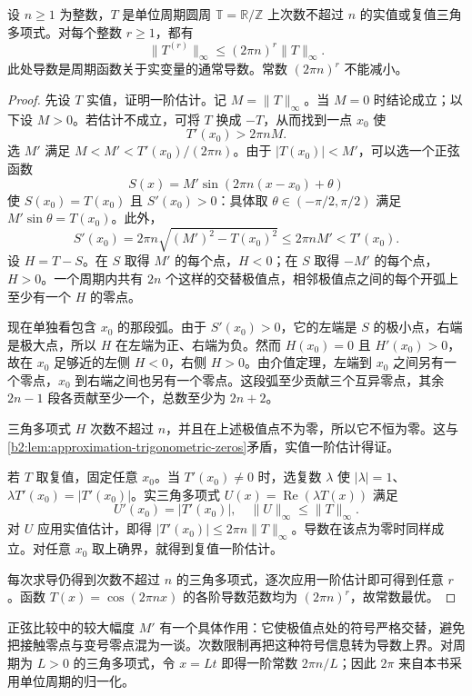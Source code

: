 \begin{theorem}
\label{b2:thm:approximation-bernstein-trigonometric}
设 \(n\geq1\) 为整数，\(T\) 是单位周期圆周 \(\mathbb T=\mathbb R/\mathbb Z\) 上次数不超过 \(n\) 的实值或复值三角多项式。对每个整数 \(r\geq1\)，都有
\[
 \lVert T^{(r)}\rVert_\infty
 \leq(2\pi n)^r\lVert T\rVert_\infty.
\]
此处导数是周期函数关于实变量的通常导数。常数 \((2\pi n)^r\) 不能减小。
\end{theorem}
\begin{proof}
先设 \(T\) 实值，证明一阶估计。记 \(M=\lVert T\rVert_\infty\)。当 \(M=0\) 时结论成立；以下设 \(M>0\)。若估计不成立，可将 \(T\) 换成 \(-T\)，从而找到一点 \(x_0\) 使
\[
 T'(x_0)>2\pi nM.
\]
选 \(M'\) 满足 \(M<M'<T'(x_0)/(2\pi n)\)。由于 \(|T(x_0)|<M'\)，可以选一个正弦函数
\[
 S(x)=M'\sin(2\pi n(x-x_0)+\theta)
\]
使 \(S(x_0)=T(x_0)\) 且 \(S'(x_0)>0\)：具体取 \(\theta\in(-\pi/2,\pi/2)\) 满足 \(M'\sin\theta=T(x_0)\)。此外，
\[
 S'(x_0)=2\pi n\sqrt{(M')^2-T(x_0)^2}
 \leq2\pi nM'<T'(x_0).
\]
设 \(H=T-S\)。在 \(S\) 取得 \(M'\) 的每个点，\(H<0\)；在 \(S\) 取得 \(-M'\) 的每个点，\(H>0\)。一个周期内共有 \(2n\) 个这样的交替极值点，相邻极值点之间的每个开弧上至少有一个 \(H\) 的零点。

现在单独看包含 \(x_0\) 的那段弧。由于 \(S'(x_0)>0\)，它的左端是 \(S\) 的极小点，右端是极大点，所以 \(H\) 在左端为正、右端为负。然而 \(H(x_0)=0\) 且 \(H'(x_0)>0\)，故在 \(x_0\) 足够近的左侧 \(H<0\)，右侧 \(H>0\)。由介值定理，左端到 \(x_0\) 之间另有一个零点，\(x_0\) 到右端之间也另有一个零点。这段弧至少贡献三个互异零点，其余 \(2n-1\) 段各贡献至少一个，总数至少为 \(2n+2\)。

三角多项式 \(H\) 次数不超过 \(n\)，并且在上述极值点不为零，所以它不恒为零。这与\cref{b2:lem:approximation-trigonometric-zeros}矛盾，实值一阶估计得证。

若 \(T\) 取复值，固定任意 \(x_0\)。当 \(T'(x_0)\neq0\) 时，选复数 \(\lambda\) 使 \(|\lambda|=1\)、\(\lambda T'(x_0)=|T'(x_0)|\)。实三角多项式 \(U(x)=\operatorname{Re}(\lambda T(x))\) 满足
\[
 U'(x_0)=|T'(x_0)|,
 \quad \lVert U\rVert_\infty\leq\lVert T\rVert_\infty.
\]
对 \(U\) 应用实值估计，即得 \(|T'(x_0)|\leq2\pi n\lVert T\rVert_\infty\)。导数在该点为零时同样成立。对任意 \(x_0\) 取上确界，就得到复值一阶估计。

每次求导仍得到次数不超过 \(n\) 的三角多项式，逐次应用一阶估计即可得到任意 \(r\)。函数 \(T(x)=\cos(2\pi nx)\) 的各阶导数范数均为 \((2\pi n)^r\)，故常数最优。
\end{proof}

正弦比较中的较大幅度 \(M'\) 有一个具体作用：它使极值点处的符号严格交替，避免把接触零点与变号零点混为一谈。次数限制再把这种符号信息转为导数上界。对周期为 \(L>0\) 的三角多项式，令 \(x=Lt\) 即得一阶常数 \(2\pi n/L\)；因此 \(2\pi\) 来自本书采用单位周期的归一化。

